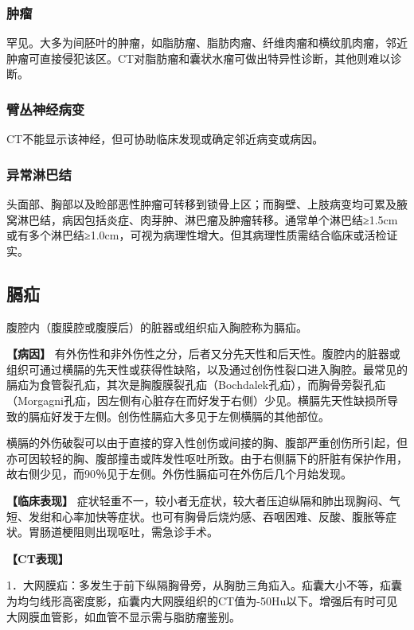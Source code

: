 \subsubsection{肿瘤}

罕见。大多为间胚叶的肿瘤，如脂肪瘤、脂肪肉瘤、纤维肉瘤和横纹肌肉瘤，邻近肿瘤可直接侵犯该区。CT对脂肪瘤和囊状水瘤可做出特异性诊断，其他则难以诊断。

\subsubsection{臂丛神经病变}

CT不能显示该神经，但可协助临床发现或确定邻近病变或病因。

\subsubsection{异常淋巴结}

头面部、胸部以及睑部恶性肿瘤可转移到锁骨上区；而胸壁、上肢病变均可累及腋窝淋巴结，病因包括炎症、肉芽肿、淋巴瘤及肿瘤转移。通常单个淋巴结≥1.5cm或有多个淋巴结≥1.0cm，可视为病理性增大。但其病理性质需结合临床或活检证实。

\subsection{膈疝}

腹腔内（腹膜腔或腹膜后）的脏器或组织疝入胸腔称为膈疝。

\textbf{【病因】}
有外伤性和非外伤性之分，后者又分先天性和后天性。腹腔内的脏器或组织可通过横膈的先天性或获得性缺陷，以及通过创伤性裂口进入胸腔。最常见的膈疝为食管裂孔疝，其次是胸腹膜裂孔疝（Bochdalek孔疝），而胸骨旁裂孔疝（Morgagni孔疝，因左侧有心脏存在而好发于右侧）少见。横膈先天性缺损所导致的膈疝好发于左侧。创伤性膈疝大多见于左侧横膈的其他部位。

横膈的外伤破裂可以由于直接的穿入性创伤或间接的胸、腹部严重创伤所引起，但亦可因较轻的胸、腹部撞击或阵发性呕吐所致。由于右侧膈下的肝脏有保护作用，故右侧少见，而90％见于左侧。外伤性膈疝可在外伤后几个月始发现。

\textbf{【临床表现】}
症状轻重不一，较小者无症状，较大者压迫纵隔和肺出现胸闷、气短、发绀和心率加快等症状。也可有胸骨后烧灼感、吞咽困难、反酸、腹胀等症状。胃肠道梗阻则出现呕吐，需急诊手术。

\textbf{【CT表现】}

1．大网膜疝：多发生于前下纵隔胸骨旁，从胸肋三角疝入。疝囊大小不等，疝囊为均匀线形高密度影，疝囊内大网膜组织的CT值为-50Hu以下。增强后有时可见大网膜血管影，如血管不显示需与脂肪瘤鉴别。

